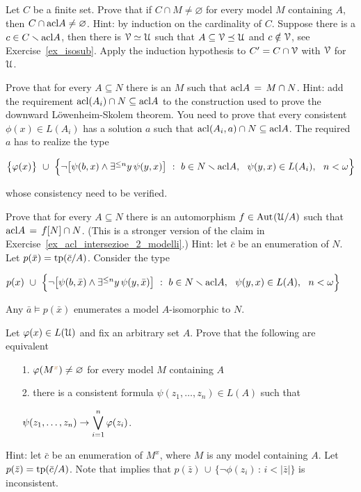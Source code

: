 \begin{exercise}\label{pofu2}
Let $C$ be a finite set.
Prove that if $C\cap M\neq\varnothing$ for every model $M$ containing $A$, then $C\cap{\rm acl} A\neq\varnothing$.
Hint: by induction on the cardinality of $C$.
Suppose there is a $c\in C\smallsetminus{\rm acl} A$, then there is $\EuScript V\simeq\EuScript U$ such that 
$A\subseteq\EuScript V\preceq\EuScript U$ and $c\notin\EuScript V$, see Exercise~\ref{ex_isosub}.
Apply the induction hypothesis to $C'=C\cap\EuScript V$ with $\EuScript V$ for $\EuScript U$.
\end{exercise}

\begin{exercise}\label{ex_acl_intersezioe_2_modelli}
Prove that for every $A\subseteq N$ there is an $M$ such that ${\rm acl} A\,=\,M\cap N$.
Hint: add the requirement ${\rm acl}(A_i)\cap N\subseteq{\rm acl} A$ to the construction 
used to prove the downward L\"owenheim-Skolem theorem.
You need to prove that every consistent $\phi(x)\in L(A_i)$ has a solution $a$ such that 
${\rm acl}(A_i,a)\cap N\subseteq{\rm acl} A$.
The required $a$ has to realize the type

\hfil$\big\{\phi(x)\big\}\ \cup\ \Big\{\neg\big[\psi(b,x)\wedge\E^{\le n}y\,\psi(y,x)\big]
\ :\ 
b\in N\sm\acl A,\ \ \psi(y,x)\in L(A_i),\ \ n<\omega\Big\}$

whose consistency need to be verified.
\end{exercise}

\begin{exercise}\label{ex_acl_intersezione_2_modelli_iso}
Prove that for every $A\subseteq N$ there is an automorphism $f\in{\rm Aut\kern.15ex}(\EuScript U/A)$ such that 
${\rm acl} A\,=\,f[N]\cap N$. 
(This is a stronger version of the claim in Exercise~\ref{ex_acl_intersezioe_2_modelli}.) 
Hint: let $\bar c$ be an enumeration of $N$.
Let $p(\bar x)={\rm tp}(\bar c/A)$. 
Consider the type

\hfil$p(x)\ \cup\ \Big\{\neg\big[\psi(b,\bar x)\wedge\E^{\le n}y\,\psi(y,\bar x)\big]
\ :\ 
b\in N\sm\acl A,\ \ \psi(y,x)\in L(A),\ \ n<\omega\Big\}$

Any $\bar a\models p(\bar x)$ enumerates a model $A$-isomorphic to $N$.
\end{exercise}

\begin{exercise}\label{ex_almost_satisfied}
Let $\varphi(x)\in L(\EuScript U)$ and fix an arbitrary set $A$.
Prove that the following are equivalent
\begin{itemize}
\item[1.] $\varphi(M^{\color{brown} x})\neq\varnothing$ for every model $M$ containing $A$
\item[2.] there is a consistent formula $\psi(z_1,\dots,z_n)\in L(A)$ such that

\hfil$\displaystyle\psi(z_1,\dots,z_n)\rightarrow\bigvee^n_{i=1}\varphi(z_i)$.
\end{itemize}
Hint: let $\bar c$ be an enumeration of $M^x$, where $M$ is any model containing $A$.
Let $p(\bar z)={\rm tp}(\bar c/A)$.
Note that \ssf{1} implies that $p(\bar z)\,\cup\, \big\{\neg\phi(z_i)\, :\, i<|\bar z|\big\}$ is inconsistent.
\end{exercise}

